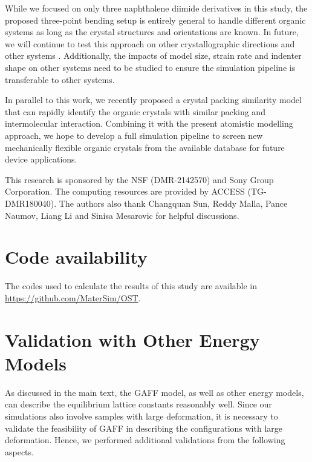 \documentclass[prb,superscriptaddress,longbibliography, twocolumn]{revtex4-1}
\begin{document}
While we focused on only three naphthalene diimide derivatives in this study, the proposed three-point bending setup is entirely general to handle different organic systems as long as the crystal structures and orientations are known. In future, we will continue to test this approach on other crystallographic directions \cite{devarapalli2019remarkably} and other systems \cite{reddy2005sorting, raju2018rationalizing, zhang2021structural, panda2015spatially, reddy2005structural, saha2018molecules}. Additionally, the impacts of model size, strain rate and indenter shape on other systems need to be studied to ensure the simulation pipeline is transferable to other systems.

In parallel to this work, we recently proposed a crystal packing similarity model \cite{zhu2022quantification} that can rapidly identify the organic crystals with similar packing and intermolecular interaction. Combining it with the present atomistic modelling approach, we hope to develop a full simulation pipeline to screen new mechanically flexible organic crystals from the available database\cite{csd} for future device applications.

\begin{acknowledgements}
This research is sponsored by the NSF (DMR-2142570) and Sony Group Corporation. The computing resources are provided by ACCESS (TG-DMR180040). The authors also thank Changquan Sun, Reddy Malla, Pance Naumov, Liang Li and Sinisa Mesarovic for helpful discussions.
\end{acknowledgements}

\section*{Code availability}
The codes used to calculate the results of this study are available in \url{https://github.com/MaterSim/OST}.

\appendix
\section{Validation with Other Energy Models}\label{a1}
As discussed in the main text, the GAFF model, as well as other energy models, can describe the equilibrium lattice constants reasonably well. Since our simulations also involve samples with large deformation, it is necessary to validate the feasibility of GAFF in describing the configurations with large deformation. Hence, we performed additional validations from the following aspects.
\end{document}

